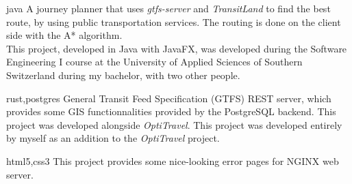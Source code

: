 \begin{CV}
    

    
    

    {}
    {java}
    {A journey planner that uses \textit{gtfs-server} and \textit{TransitLand} to find the best route, by using
    public transportation services. The routing is done on the client side with the A* algorithm.\\
    This project, developed in Java with JavaFX, was developed during the Software Engineering I course
    at the University of Applied Sciences of Southern Switzerland during my bachelor,
    with two other people.}

    
    {}
    {rust,postgres}
    {General Transit Feed Specification (GTFS) REST server, which provides some GIS functionnalities provided
    by the PostgreSQL backend. This project was developed alongside \textit{OptiTravel}.
    This project was developed entirely by myself as an addition to the \textit{OptiTravel} project.}


    {}
    {html5,css3}
    {This project provides some nice-looking error pages for NGINX web server.}
    


\end{CV}
